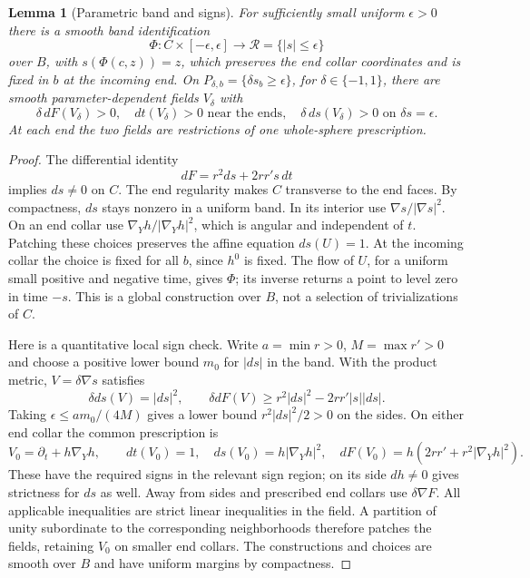 \documentclass[11pt]{article}
\newtheorem{lemma}[theorem]{Lemma}
\begin{document}
\begin{lemma}[Parametric band and signs]\label{lem:band}
For sufficiently small uniform $\epsilon>0$ there is a smooth band
identification
\[
 \Phi:C\times[-\epsilon,\epsilon]\longrightarrow
 \mathcal R=\{|s|\leq\epsilon\}
\]
over $B$, with $s(\Phi(c,z))=z$, which preserves the end collar coordinates
and is fixed in $b$ at the incoming end. On
$P_{\delta,b}=\{\delta s_b\geq\epsilon\}$, for $\delta\in\{-1,1\}$,
there are smooth parameter-dependent fields $V_\delta$ with
\[
 \delta\,dF(V_\delta)>0,\quad
 dt(V_\delta)>0\text{ near the ends},\quad
 \delta\,ds(V_\delta)>0\text{ on }\delta s=\epsilon.
\]
At each end the two fields are restrictions of one whole-sphere
prescription.
\end{lemma}
\begin{proof}
The differential identity
\[
 dF=r^2ds+2rr's\,dt                                      \tag{1}
\]
implies $ds\ne0$ on $C$. The end regularity makes $C$ transverse to
the end faces. By compactness, $ds$ stays nonzero in a uniform band.
In its interior use $\nabla s/|\nabla s|^2$.
On an end collar use $\nabla_Yh/|\nabla_Yh|^2$, which is angular
and independent of $t$. Patching these choices preserves the affine
equation $ds(U)=1$. At the incoming collar the choice is fixed for
all $b$, since $h^0$ is fixed. The flow of $U$, for a uniform small
positive and negative time, gives $\Phi$; its inverse returns a point
to level zero in time $-s$. This is a global construction over $B$,
not a selection of trivializations of $C$.

Here is a quantitative local sign check. Write $a=\min r>0$,
$M=\max r'>0$ and choose a positive lower bound $m_0$ for $|ds|$
in the band. With the product metric, $V=\delta\nabla s$ satisfies
\[
 \delta ds(V)=|ds|^2,\qquad
 \delta dF(V)\geq r^2|ds|^2-2rr'|s||ds|.
\]
Taking $\epsilon\leq a m_0/(4M)$ gives a lower bound
$r^2|ds|^2/2>0$ on the sides.
On either end collar the common prescription is
\[
 V_0=\partial_t+h\nabla_Yh,\qquad
 dt(V_0)=1,\quad ds(V_0)=h|\nabla_Yh|^2,\quad
 dF(V_0)=h(2rr'+r^2|\nabla_Yh|^2).                       \tag{2}
\]
These have the required signs in the relevant sign region; on its side
$dh\ne0$ gives strictness for $ds$ as well.
Away from sides and prescribed end collars use $\delta\nabla F$.
All applicable inequalities are strict linear inequalities in the field.
A partition of unity subordinate to the corresponding neighborhoods
therefore patches the fields, retaining $V_0$ on smaller end collars.
The constructions and choices are smooth over $B$ and have uniform
margins by compactness.
\end{proof}
\end{document}
